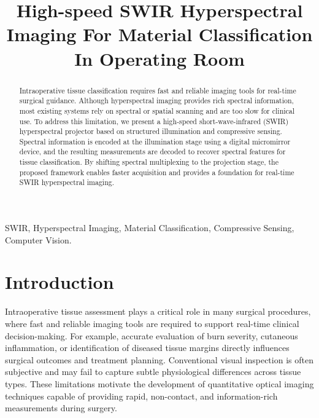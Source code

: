\documentclass[conference]{IEEEtran}
\begin{document}
\title{High-speed SWIR Hyperspectral Imaging For Material Classification In Operating Room\\
}



\author{
}



\maketitle
\begin{abstract}
Intraoperative tissue classification requires fast and reliable imaging tools for real-time surgical guidance. Although hyperspectral imaging provides rich spectral information, most existing systems rely on spectral or spatial scanning and are too slow for clinical use. To address this limitation, we present a high-speed short-wave-infrared (SWIR) hyperspectral projector based on structured illumination and compressive sensing. Spectral information is encoded at the illumination stage using a digital micromirror device, and the resulting measurements are decoded to recover spectral features for tissue classification. By shifting spectral multiplexing to the projection stage, the proposed framework enables faster acquisition and provides a foundation for real-time SWIR hyperspectral imaging.
\end{abstract}

\begin{IEEEkeywords}
SWIR, Hyperspectral Imaging, Material Classification, Compressive Sensing, Computer Vision.
\end{IEEEkeywords}

\section{Introduction}
Intraoperative tissue assessment plays a critical role in many surgical procedures, where fast and reliable imaging tools are required to support real-time clinical decision-making. For example, accurate evaluation of burn severity\cite{2020Burn}, cutaneous inflammation\cite{Du2020SWIRDermatitis}, or identification of diseased tissue margins directly influences surgical outcomes and treatment planning. Conventional visual inspection is often subjective and may fail to capture subtle physiological differences across tissue types. These limitations motivate the development of quantitative optical imaging techniques capable of providing rapid, non-contact, and information-rich measurements during surgery.
\end{document}
